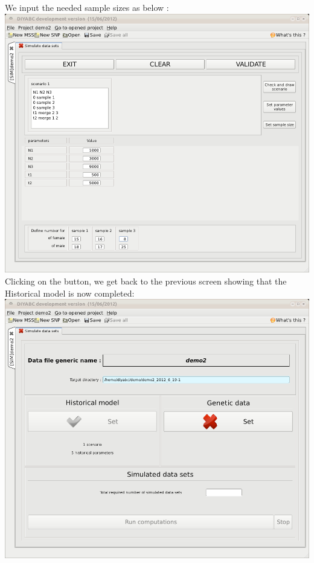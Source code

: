 We input the needed sample sizes as below :\\


\includegraphics[scale=0.33]{gui_pictures/Capture-DIYABC-69} \\


Clicking on the  button, we get back to
the previous screen showing that the Historical model is now completed:\\


\includegraphics[scale=0.33]{gui_pictures/Capture-DIYABC-70} \\


